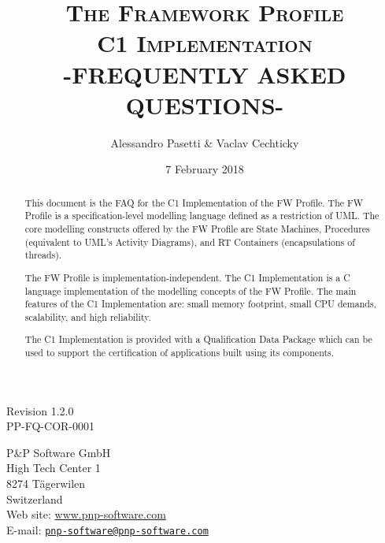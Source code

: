 \documentclass[a4paper,10pt]{article}
\title{\textsc{The Framework Profile} \\ \textsc{C1 Implementation} \\ \textsc{-FREQUENTLY ASKED QUESTIONS-}}
\author{Alessandro Pasetti \& Vaclav Cechticky}
\date{7 February 2018}
\begin{document}
\maketitle

\begin{center}
Revision 1.2.0 \\
PP-FQ-COR-0001
\end{center}

\vspace{1cm}

\begin{center}
P\&P Software GmbH \\
High Tech Center 1 \\
8274 T\"{a}gerwilen \\
Switzerland \\
\vspace{2mm}
Web site: \url{www.pnp-software.com}\\
E-mail: \href{mailto:pnp-software@pnp-software.com}{\nolinkurl{pnp-software@pnp-software.com}} 
\end{center}

\vspace{0.5cm}

\begin{table}[ht]
\begin{center}
\begin{tabular}{p{11.7cm}}
\\
\hline
\end{tabular}
\end{center}
\end{table}
\begin{abstract}
This document is the FAQ for the C1 Implementation of the FW Profile. The FW Profile is a specification-level modelling language defined as a restriction of UML. The core modelling constructs offered by the FW Profile are State Machines, Procedures (equivalent to UML's Activity Diagrams), and RT Containers (encapsulations of threads).
\par
The FW Profile is implementation-independent. The C1 Implementation is a C language implementation of the modelling concepts of the FW Profile. The main features of the C1 Implementation are: small memory footprint, small CPU demands, scalability, and
high reliability. 
\par
The C1 Implementation is provided with a Qualification Data Package which can be used to support the certification of applications built using its components.
\end{abstract}
\begin{table}[ht]
\begin{center}
\begin{tabular}{p{11.7cm}}
\\
\hline
\end{tabular}
\end{center}
\end{table}
\end{document}
